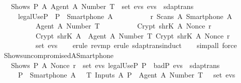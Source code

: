 \begin{isabellebody}
  \ \ {\isachardoublequoteopen}{\isasymlbrakk}\ Shows\ P\ A\ {\isasymlbrace}Agent\ A{\isacharcomma}\ Number\ T{\isasymrbrace}\ {\isasymin}\ set\ evs{\isacharsemicolon}\ evs\ {\isasymin}\ sdaptrans\ {\isasymrbrakk}\isanewline
  \ \ \ \ {\isasymLongrightarrow}\ {\isacharparenleft}legalUse{\isacharparenleft}P{\isacharparenright}{\isacharparenright}\ {\isasymand}\ P\ {\isacharequal}\ {\isacharparenleft}Smartphone\ A{\isacharparenright}\ {\isasymand}\isanewline
  \ \ \ \ \ \ \ \ {\isacharparenleft}{\isasymexists}\ r{\isachardot}\ Scans\ A\ {\isacharparenleft}Smartphone\ A{\isacharparenright}\ {\isasymlbrace}\isanewline
  \ \ \ \ \ \ \ \ \ \ {\isasymlbrace}Agent\ A{\isacharcomma}\ Number\ T{\isasymrbrace}{\isacharcomma}\isanewline
  \ \ \ \ \ \ \ \ \ \ Crypt\ {\isacharparenleft}shrK\ A{\isacharparenright}\ {\isacharparenleft}Nonce\ r{\isacharparenright}{\isacharcomma}\isanewline
  \ \ \ \ \ \ \ \ \ \ Crypt\ {\isacharparenleft}shrK\ A{\isacharparenright}\ {\isasymlbrace}\ {\isasymlbrace}Agent\ A{\isacharcomma}\ Number\ T{\isasymrbrace}{\isacharcomma}\ Crypt\ {\isacharparenleft}shrK\ A{\isacharparenright}\ {\isacharparenleft}Nonce\ r{\isacharparenright}\ {\isasymrbrace}\isanewline
  \ \ \ \ \ \ \ \ {\isasymrbrace}\ {\isasymin}\ set\ evs{\isacharparenright}{\isachardoublequoteclose}\isanewline
  \isadelimproof
  \isanewline
  \ \ %
  \endisadelimproof
  \isatagproof
  \isamarkupfalse%
  \ {\isacharparenleft}erule\ rev{\isacharunderscore}mp{\isacharcomma}\ erule\ sdaptrans{\isachardot}induct{\isacharparenright}\isanewline
  \ \ \isamarkupfalse%
  \ {\isacharparenleft}simp{\isacharunderscore}all{\isacharcomma}\ force{\isacharplus}{\isacharparenright}\isanewline
  \isamarkupfalse%
  \endisatagproof
  {\isafoldproof}%
  \isadelimproof
  \isanewline
  \endisadelimproof
  \isanewline
  \isanewline
  \isamarkupfalse%
  \ Shows{\isacharunderscore}uncompromised{\isacharunderscore}A{\isacharunderscore}Smartphone{\isacharunderscore}{}\ {\isacharcolon}\isanewline
  \ \ {\isachardoublequoteopen}{\isasymlbrakk}\ Shows\ P\ A\ {\isacharparenleft}Nonce\ r{\isacharparenright}\ {\isasymin}\ set\ evs{\isacharsemicolon}\ legalUse{\isacharparenleft}P{\isacharparenright}{\isacharsemicolon}\ P\ {\isasymnotin}\ badP{\isacharsemicolon}\ evs\ {\isasymin}\ sdaptrans\ {\isasymrbrakk}\isanewline
  \ \ \ \ {\isasymLongrightarrow}\ {\isacharparenleft}P\ {\isacharequal}\ {\isacharparenleft}Smartphone\ A{\isacharparenright}{\isacharparenright}\ {\isasymand}\ {\isacharparenleft}{\isasymexists}\ T{\isachardot}\ Inputs\ A\ P\ {\isasymlbrace}\ Agent\ A{\isacharcomma}\ Number\ T\ {\isasymrbrace}\ {\isasymin}\ set\ evs{\isacharparenright}{\isachardoublequoteclose}\isanewline

\end{isabellebody}
